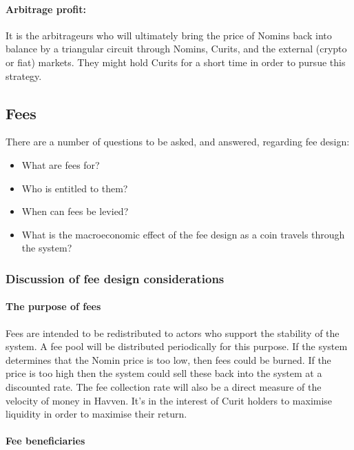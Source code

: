 \paragraph{Arbitrage profit:}
It is the arbitrageurs who will ultimately bring the price of Nomins back into balance by a triangular circuit through Nomins, Curits, and the external (crypto or fiat) markets. They might hold Curits for a short time in order to pursue this strategy.


\pagebreak
\subsection{Fees}

There are a number of questions to be asked, and answered, regarding fee design:

\begin{itemize}
    \item What are fees for?
    \item Who is entitled to them?
    \item When can fees be levied?
    \item What is the macroeconomic effect of the fee design as a coin travels through the system?
\end{itemize}

\subsubsection{Discussion of fee design considerations}

\paragraph{The purpose of fees}

Fees are intended to be redistributed to actors who support the stability of the system. A fee pool will be distributed periodically for this purpose. If the system determines that the Nomin price is too low, then fees could be burned. If the price is too high then the system could sell these back into the system at a discounted rate. The fee collection rate will also be a direct measure of the velocity of money in Havven. It's in the interest of Curit holders to maximise liquidity in order to maximise their return.

\paragraph{Fee beneficiaries}

